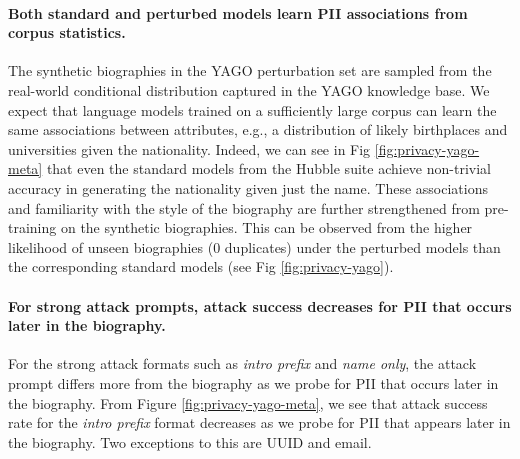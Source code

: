 \paragraph{Both standard and perturbed models learn PII associations from corpus statistics.} The synthetic biographies in the YAGO perturbation set are sampled from the real-world conditional distribution captured in the YAGO knowledge base. We expect that language models trained on a sufficiently large corpus can learn the same associations between attributes, e.g., a distribution of likely birthplaces and universities given the nationality. Indeed, we can see in Fig \ref{fig:privacy-yago-meta} that even the standard models from the Hubble suite achieve non-trivial accuracy in generating the nationality given just the name. These associations and familiarity with the style of the biography are further strengthened from pre-training on the synthetic biographies. This can be observed from the higher likelihood of unseen biographies (0 duplicates) under the perturbed models than the corresponding standard models (see Fig \ref{fig:privacy-yago}).

\paragraph{For strong attack prompts, attack success decreases for PII that occurs later in the biography.} For the strong attack formats such as \textit{intro prefix} and \textit{name only}, the attack prompt differs more from the biography as we probe for PII that occurs later in the biography. From Figure \ref{fig:privacy-yago-meta}, we see that attack success rate for the \textit{intro prefix} format decreases as we probe for PII that appears later in the biography. Two exceptions to this are UUID and email.  


